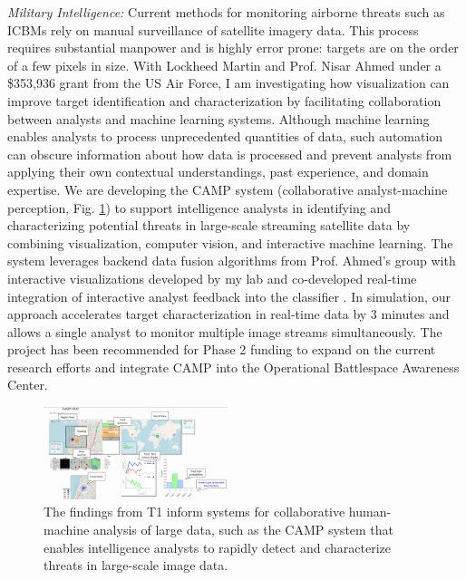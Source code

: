 \documentclass[11pt]{article}
\begin{document}
\emph{Military Intelligence:} Current methods for monitoring airborne threats such as ICBMs rely on manual surveillance of satellite imagery data. This process requires substantial manpower and is highly error prone: targets are on the order of a few pixels in size. With Lockheed Martin and Prof. Nisar Ahmed under a \$353,936 grant from the US Air Force, I am investigating how visualization can improve target identification and characterization
by facilitating collaboration between analysts and machine learning systems. Although machine learning enables analysts to process unprecedented quantities of data, such automation can obscure information about how data is processed and prevent analysts from applying their own contextual understandings, past experience, and domain expertise. 
We are developing the CAMP system (collaborative analyst-machine perception, Fig. \ref{interface}) to support intelligence analysts in identifying and characterizing potential threats in large-scale streaming satellite data by combining visualization, computer vision, and interactive machine learning. The system leverages backend data fusion algorithms from Prof. Ahmed's group with interactive visualizations developed by my lab and co-developed real-time integration of interactive analyst feedback into the classifier \cite{muesing2019}. In simulation, our approach accelerates target characterization in real-time data by 3 minutes and allows a single analyst to monitor multiple image streams simultaneously. The project has been recommended for Phase 2 funding to expand on the current research efforts and integrate CAMP into the Operational Battlespace Awareness Center. 

\begin{figure}
	\begin{center}
		\includegraphics[width=0.48\textwidth]{interface}
	\end{center}
	\caption{The findings from T1 inform systems for collaborative human-machine analysis of large data, such as the CAMP system that enables intelligence analysts to rapidly detect and characterize threats in large-scale image data.}\label{interface}
\end{figure}
\end{document}
